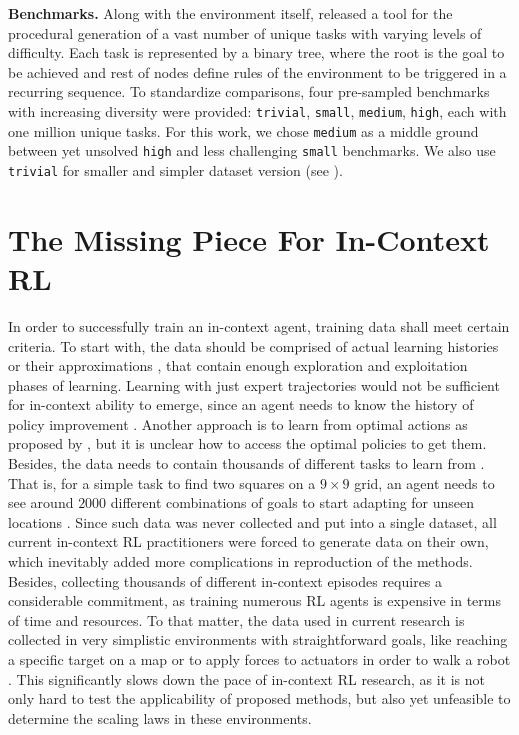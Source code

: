 \documentclass{article}
\begin{document}
\textbf{Benchmarks.} Along with the environment itself, \citet{nikulin2023xland} released a tool for the procedural generation of a vast number of unique tasks with varying levels of difficulty. Each task is represented by a binary tree, where the root is the goal to be achieved and rest of nodes define rules of the environment to be triggered in a recurring sequence. To standardize comparisons, four pre-sampled benchmarks with increasing diversity were provided: \texttt{trivial}, \texttt{small}, \texttt{medium}, \texttt{high}, each with one million unique tasks. For this work, we chose \texttt{medium} as a middle ground between yet unsolved \texttt{high} and less challenging \texttt{small} benchmarks. We also use \texttt{trivial} for smaller and simpler dataset version (see ).
\section{The Missing Piece For In-Context RL}
\label{sec:missing-data}
In order to successfully train an in-context agent, training data shall meet certain criteria. To start with, the data should be comprised of actual learning histories \citep{laskin2022context} or their approximations \citep{zisman2023emergence}, that contain enough exploration and exploitation phases of learning. Learning with just expert trajectories would not be sufficient for in-context ability to emerge, since an agent needs to know the history of policy improvement \citep{laskin2022context, kirsch2023towards}. Another approach is to learn from optimal actions as proposed by \cite{lee2023supervised}, but it is unclear how to access the optimal policies to get them. Besides, the data needs to contain thousands of different tasks to learn from \citep{kirsch2022general}. That is, for a simple task to find two squares on a $9\times9$ grid, an agent needs to see around $2000$ different combinations of goals to start adapting for unseen locations \citep{laskin2022context}. Since such data was never collected and put into a single dataset, all current in-context RL practitioners were forced to generate data on their own, which inevitably added more complications in reproduction of the methods.
Besides, collecting thousands of different in-context episodes requires a considerable commitment, as training numerous RL agents is expensive in terms of time and resources. To that matter, the data used in current research is collected in very simplistic environments with straightforward goals, like reaching a specific target on a map \citep{laskin2022context, lee2023supervised, zisman2023emergence} or to apply forces to actuators in order to walk a robot \citep{kirsch2023towards}. This significantly slows down the pace of in-context RL research, as it is not only hard to test the applicability of proposed methods, but also yet unfeasible to determine the scaling laws in these environments.
\end{document}
